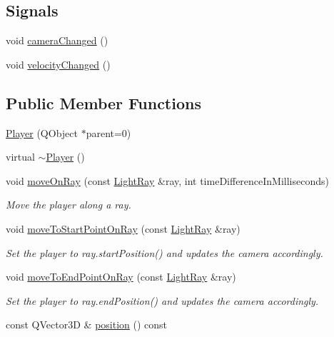 \subsection*{Signals}
\begin{DoxyCompactItemize}
\item 
void \hyperlink{class_player_aef620bc75871b32311560a7b2a31c144}{camera\+Changed} ()
\item 
void \hyperlink{class_player_a22ae3d9604e92fa12cfad39fe40e8651}{velocity\+Changed} ()
\end{DoxyCompactItemize}
\subsection*{Public Member Functions}
\begin{DoxyCompactItemize}
\item 
\hyperlink{class_player_a5c2a46dbacbc28b7cfbe352b6c0db644}{Player} (Q\+Object $\ast$parent=0)
\item 
virtual \hyperlink{class_player_a749d2c00e1fe0f5c2746f7505a58c062}{$\sim$\+Player} ()
\item 
void \hyperlink{class_player_a6dcd0b9f4d678260314878ab20ce6e09}{move\+On\+Ray} (const \hyperlink{class_light_ray}{Light\+Ray} \&ray, int time\+Difference\+In\+Milliseconds)
\begin{DoxyCompactList}\small\item\em Move the player along a ray. \end{DoxyCompactList}\item 
void \hyperlink{class_player_a38269e0706f91b71c6e8f8373c397969}{move\+To\+Start\+Point\+On\+Ray} (const \hyperlink{class_light_ray}{Light\+Ray} \&ray)
\begin{DoxyCompactList}\small\item\em Set the player to ray.\+start\+Position() and updates the camera accordingly. \end{DoxyCompactList}\item 
void \hyperlink{class_player_a0a4ebefb0f7593d79573ddcfe68e8e2f}{move\+To\+End\+Point\+On\+Ray} (const \hyperlink{class_light_ray}{Light\+Ray} \&ray)
\begin{DoxyCompactList}\small\item\em Set the player to ray.\+end\+Position() and updates the camera accordingly. \end{DoxyCompactList}\item 
const Q\+Vector3\+D \& \hyperlink{class_player_a0c307c67d3c6d64ee9c5b724c1e2b095}{position} () const 

\end{DoxyCompactItemize}
